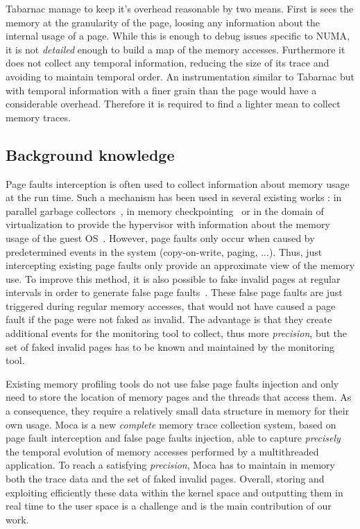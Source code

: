 \gls{Tabarnac} manage to keep it's overhead reasonable by two means.
First is sees the memory at the granularity of the page, loosing any information about the internal usage of a page.
While this is enough to debug issues specific to \gls{NUMA}, it is not \emph{detailed} enough to build a map of the memory accesses.
Furthermore it does not collect any temporal information, reducing the size of its trace and avoiding to maintain temporal order.
An instrumentation similar to \gls{Tabarnac} but with temporal information with a finer grain than the page would have a considerable overhead.
Therefore it is required to find a lighter mean to collect memory traces.

\subsection{Background knowledge}

Page faults interception is often used to collect information about memory usage at the run time.
Such a mechanism has been used in several existing works : in parallel garbage collectors~\cite{Boehm91Mostly}, in memory checkpointing~\cite{Heo05Spaceefficient} or in the domain of virtualization to provide the hypervisor with information about the memory usage of the guest \gls{OS}~\cite{Jones06Geiger}.
However, page faults only occur when caused by predetermined events in the system (copy-on-write, paging, ...).
Thus, just intercepting existing page faults only provide an approximate view of the memory use.
To improve this method, it is also possible to fake invalid pages at regular intervals in order to generate false page faults~\cite{Bae12Dynamic,Diener13CommunicationBased}.
These false page faults are just triggered during regular memory accesses, that would not have caused a page fault if the page were not faked as invalid.
The advantage is that they create additional events for the monitoring tool to collect, thus more \emph{precision}, but the set of faked invalid pages has to be known and maintained by the monitoring tool.

Existing memory profiling tools do not use false page faults injection and only need to store the location of memory pages and the threads that access them.
As a consequence, they require a relatively small data structure in memory for their own usage.
\gls{Moca} is a new \emph{complete} memory trace collection system, based on page fault interception and false page faults injection, able to capture \emph{precisely} the temporal evolution of memory accesses performed by a multithreaded application.
To reach a satisfying \emph{precision}, \gls{Moca} has to maintain in memory both the trace data and the set of faked invalid pages.
Overall, storing and exploiting efficiently these data within the kernel space and outputting them in real time to the user space is a challenge and is the main contribution of our work.

